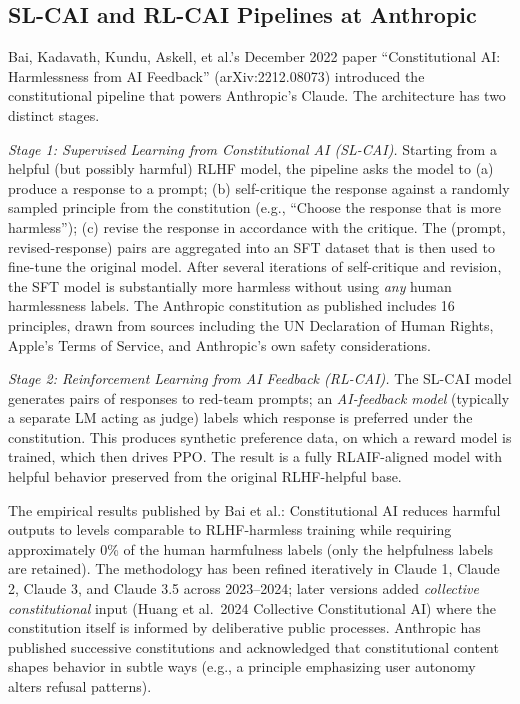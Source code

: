\subsection{SL-CAI and RL-CAI Pipelines at Anthropic}\label{sl-cai-and-rl-cai-pipelines-at-anthropic}

Bai, Kadavath, Kundu, Askell, et al.'s December 2022 paper ``Constitutional AI: Harmlessness from AI Feedback'' (arXiv:2212.08073) introduced the constitutional pipeline that powers Anthropic's Claude. The architecture has two distinct stages.

\emph{Stage 1: Supervised Learning from Constitutional AI (SL-CAI).} Starting from a helpful (but possibly harmful) RLHF model, the pipeline asks the model to (a) produce a response to a prompt; (b) self-critique the response against a randomly sampled principle from the constitution (e.g., ``Choose the response that is more harmless''); (c) revise the response in accordance with the critique. The (prompt, revised-response) pairs are aggregated into an SFT dataset that is then used to fine-tune the original model. After several iterations of self-critique and revision, the SFT model is substantially more harmless without using \emph{any} human harmlessness labels. The Anthropic constitution as published includes 16 principles, drawn from sources including the UN Declaration of Human Rights, Apple's Terms of Service, and Anthropic's own safety considerations.

\emph{Stage 2: Reinforcement Learning from AI Feedback (RL-CAI).} The SL-CAI model generates pairs of responses to red-team prompts; an \emph{AI-feedback model} (typically a separate LM acting as judge) labels which response is preferred under the constitution. This produces synthetic preference data, on which a reward model is trained, which then drives PPO. The result is a fully RLAIF-aligned model with helpful behavior preserved from the original RLHF-helpful base.

The empirical results published by Bai et al.: Constitutional AI reduces harmful outputs to levels comparable to RLHF-harmless training while requiring approximately 0\% of the human harmfulness labels (only the helpfulness labels are retained). The methodology has been refined iteratively in Claude 1, Claude 2, Claude 3, and Claude 3.5 across 2023--2024; later versions added \emph{collective constitutional} input (Huang et al.~2024 Collective Constitutional AI) where the constitution itself is informed by deliberative public processes. Anthropic has published successive constitutions and acknowledged that constitutional content shapes behavior in subtle ways (e.g., a principle emphasizing user autonomy alters refusal patterns).

